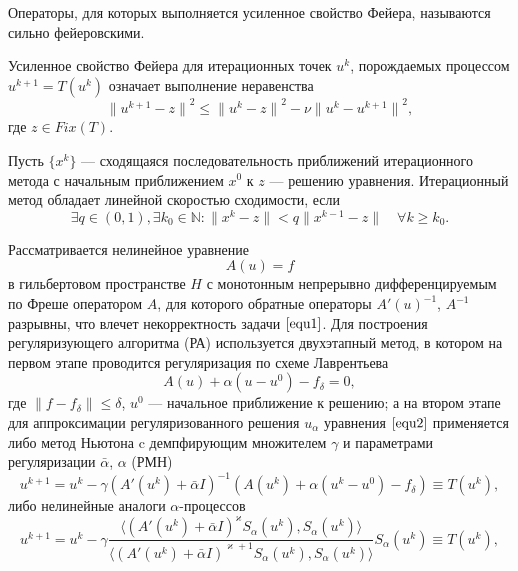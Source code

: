 Операторы, для которых выполняется усиленное свойство Фейера, называются сильно фейеровскими.
\begin{definition}
	Усиленное свойство Фейера для итерационных точек $u^k$, порождаемых процессом $u^{k+1}=T(u^k)$ означает выполнение неравенства
	\begin{equation}\label{fejer_prop_it}
	{\|u^{k+1}-z\|}^2\le{\|u^k-z\|}^2-\nu{\|u^k-u^{k+1}\|}^2,
	\end{equation}
	где $z\in Fix(T)$.
\end{definition}
\begin{definition}
	Пусть $\{x^k\}$ --- сходящаяся последовательность приближений итерационного метода с начальным приближением $x^0$ к $z$ --- решению уравнения. 
	Итерационный метод обладает линейной скоростью сходимости, если $$\exists q\in (0,1), \exists k_0\in\mathbb{N}: \|x^k-z\|<q\|x^{k-1}-z\| \quad \forall k\ge k_0.$$ 
\end{definition}
Рассматривается нелинейное уравнение
\begin{equation}\label{equ1}A(u)=f\end{equation}
в гильбертовом пространстве $H$ с монотонным непрерывно дифференцируемым по Фреше оператором $A$, для которого обратные операторы $A'(u)^{-1}$, $A^{-1}$ разрывны, что влечет некорректность задачи $\eqref{equ1}$. Для построения регуляризующего алгоритма (РА) используется двухэтапный метод, в котором на первом этапе проводится регуляризация по схеме Лаврентьева
\begin{equation}\label{equ2}A(u)+\alpha(u-u^0)-f_\delta=0,\end{equation}
где $\|f-f_\delta\|\le\delta$, $u^0$ --- начальное приближение к решению; а на втором этапе для аппроксимации регуляризованного решения $u_\alpha$ уравнения $\eqref{equ2}$ применяется либо метод Ньютона c демпфирующим множителем $\gamma$ и параметрами регуляризации $\bar\alpha$, $\alpha$ (РМН)
\begin{equation}\label{equ_rmn}
u^{k+1}=u^k-\gamma(A'(u^k)+\bar\alpha I)^{-1}(A(u^k)+\alpha(u^k-u^0)-f_\delta)\equiv{T(u^k)},
\end{equation}
либо нелинейные аналоги $\alpha$-процессов
\begin{equation}\label{equ_alphaproc}
u^{k+1}=u^k-\gamma\frac{\langle (A'(u^k)+\bar\alpha I)^{\varkappa}S_\alpha(u^k), S_\alpha(u^k)\rangle }{\langle(A'(u^k)+\bar\alpha I)^{\varkappa+1}S_\alpha(u^k), S_\alpha(u^k)\rangle }S_\alpha(u^k)\equiv{T(u^k)},
\end{equation}
